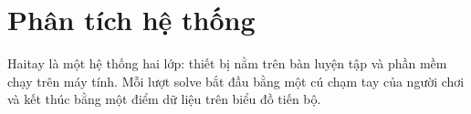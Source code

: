 \chapter{Phân tích hệ thống}

Haitay là một hệ thống hai lớp: thiết bị nằm trên bàn luyện tập và phần mềm chạy trên máy tính. Mỗi lượt solve bắt đầu bằng một cú chạm tay của người chơi và kết thúc bằng một điểm dữ liệu trên biểu đồ tiến bộ.


\ifdefined\skipcontext\else\fi
\ifdefined\skipdevice\else\fi
\ifdefined\skipcomm\else\fi
